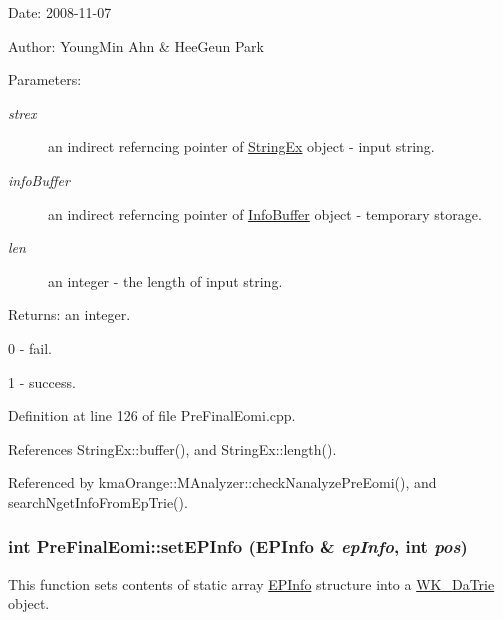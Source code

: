 \begin{Desc}
\item[Date:]2008-11-07 \end{Desc}
\begin{Desc}
\item[Author:]YoungMin Ahn \& HeeGeun Park \end{Desc}
\begin{Desc}
\item[Parameters:]
\begin{description}
\item[{\em strex}]an indirect referncing pointer of \hyperlink{classStringEx}{StringEx} object - input string. \item[{\em infoBuffer}]an indirect referncing pointer of \hyperlink{classkmaOrange_1_1InfoBuffer}{InfoBuffer} object - temporary storage. \item[{\em len}]an integer - the length of input string. \end{description}
\end{Desc}
\begin{Desc}
\item[Returns:]an integer.\par
 0 - fail.\par
 1 - success. \end{Desc}


Definition at line 126 of file PreFinalEomi.cpp.

References StringEx::buffer(), and StringEx::length().

Referenced by kmaOrange::MAnalyzer::checkNanalyzePreEomi(), and searchNgetInfoFromEpTrie().\hypertarget{classkmaOrange_1_1PreFinalEomi_02b86bb7101056a9a006404beac50543}{
\subsubsection[{setEPInfo}]{\setlength{\rightskip}{0pt plus 5cm}int PreFinalEomi::setEPInfo ({\bf EPInfo} \& {\em epInfo}, \/  int {\em pos})}}
\label{classkmaOrange_1_1PreFinalEomi_02b86bb7101056a9a006404beac50543}


This function sets contents of static array \hyperlink{structkmaOrange_1_1EPInfo}{EPInfo} structure into a \hyperlink{classkmaOrange_1_1WK__DaTrie}{WK\_\-DaTrie} object. 

